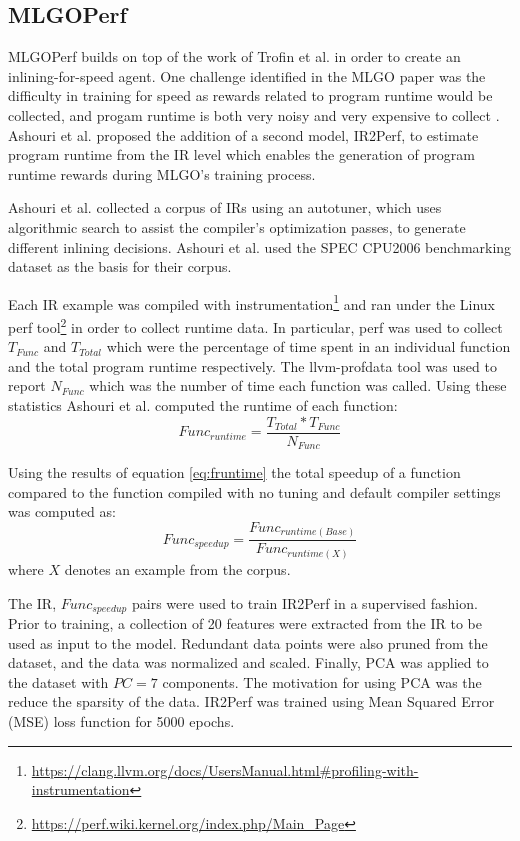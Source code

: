 \documentclass[nohyperref]{article}
\theoremstyle{plain}
\theoremstyle{definition}
\theoremstyle{remark}
\begin{document}
\subsection{MLGOPerf}
MLGOPerf \cite{mlgoperf} builds on top of the work of Trofin et al. in order to create an inlining-for-speed agent. One challenge identified in the MLGO paper was the difficulty in training for speed as rewards related to program runtime would be collected, and progam runtime is both very noisy and very expensive to collect \cite{mlgo}. Ashouri et al. proposed the addition of a second model, IR2Perf, to estimate program runtime from the IR level which enables the generation of program runtime rewards during MLGO's training process.

Ashouri et al. collected a corpus of IRs using an autotuner, which uses algorithmic search to assist the compiler's optimization passes, to generate different inlining decisions. Ashouri et al. used the SPEC CPU2006 benchmarking dataset \cite{spec2006} as the basis for their corpus.

Each IR example was compiled with instrumentation\footnote{\href{https://clang.llvm.org/docs/UsersManual.html\#profiling-with-instrumentation}{https://clang.llvm.org/docs/UsersManual.html\#profiling-with-instrumentation}} and ran under the Linux perf tool\footnote{\href{https://perf.wiki.kernel.org/index.php/Main\_Page}{https://perf.wiki.kernel.org/index.php/Main\_Page}} in order to collect runtime data. In particular, perf was used to collect $T_{Func}$ and $T_{Total}$ which were the percentage of time spent in an individual function and the total program runtime respectively. The llvm-profdata tool was used to report $N_{Func}$ which was the number of time each function was called. Using these statistics Ashouri et al. computed the runtime of each function:
\begin{equation} \label{eq:fruntime}
    Func_{runtime} = \frac{T_{Total} * T_{Func}}{N_{Func}}
\end{equation}

Using the results of equation \ref{eq:fruntime} the total speedup of a function compared to the function compiled with no tuning and default compiler settings was computed as:
\begin{equation}\label{eq:fspeedup}
    Func_{speedup} = \frac{Func_{runtime(Base)}}{Func_{runtime(X)}}
\end{equation}
where $X$ denotes an example from the corpus.

The IR, $Func_{speedup}$ pairs were used to train IR2Perf in a supervised fashion. Prior to training, a collection of 20 features were extracted from the IR to be used as input to the model. Redundant data points were also pruned from the dataset, and the data was normalized and scaled. Finally, PCA was applied to the dataset with $PC=7$ components. The motivation for using PCA was the reduce the sparsity of the data. IR2Perf was trained using Mean Squared Error (MSE) loss function for 5000 epochs.
\end{document}
